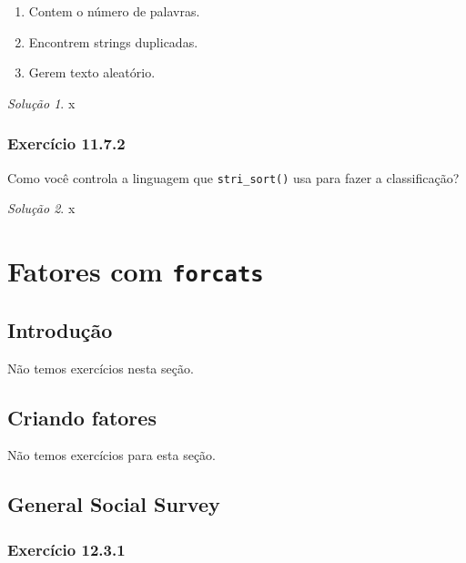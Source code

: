 \documentclass[
]{latex/krantz}
\providecommand{\tightlist}{%
  \setlength{\itemsep}{0pt}\setlength{\parskip}{0pt}}
\theoremstyle{definition}
\theoremstyle{definition}
\theoremstyle{definition}
\theoremstyle{definition}
\theoremstyle{remark}
\newtheorem*{solution}{Solução}
\begin{document}
\begin{enumerate}
\def\labelenumi{\alph{enumi}.}
\tightlist
\item
  Contem o número de palavras.
\item
  Encontrem strings duplicadas.
\item
  Gerem texto aleatório.
\end{enumerate}

\begin{solution}
x
\end{solution}

\hypertarget{exr11-7-2}{%
\subsection*{Exercício 11.7.2}\label{exr11-7-2}}

Como você controla a linguagem que \texttt{stri\_sort()} usa para fazer a classificação?

\begin{solution}
x
\end{solution}

\hypertarget{fatores-com-forcats}{%
\chapter{\texorpdfstring{Fatores com \texttt{forcats}}{Fatores com forcats}}\label{fatores-com-forcats}}

\hypertarget{introduuxe7uxe3o-8}{%
\section{Introdução}\label{introduuxe7uxe3o-8}}

Não temos exercícios nesta seção.

\hypertarget{criando-fatores}{%
\section{Criando fatores}\label{criando-fatores}}

Não temos exercícios para esta seção.

\hypertarget{general-social-survey}{%
\section{General Social Survey}\label{general-social-survey}}

\hypertarget{exr12-3-1}{%
\subsection*{Exercício 12.3.1}\label{exr12-3-1}}
\end{document}
